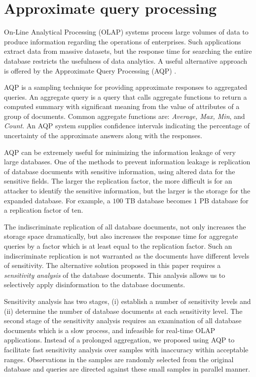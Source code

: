 \section{Approximate query processing}
\label{sec:ApproximateQueryProcessing}

On-Line Analytical Processing (OLAP) systems process large volumes of data to produce information regarding the operations of enterprises. Such applications extract data from  massive datasets, but the response time for searching the entire database restricts the usefulness of data analytics. A useful alternative approach is offered  by the Approximate Query Processing (AQP) \cite{Agarwal:2014:KYW:2588555.2593667}.

AQP is a sampling technique for providing approximate responses to aggregated queries. An aggregate query is a query that calls aggregate functions to return a computed summary with significant meaning from the value of attributes of a group of documents. Common aggregate functions are: {\it Average, Max, Min}, and {\it Count}. An AQP system supplies confidence intervals indicating the percentage of uncertainty of the approximate answers along with the responses.  

AQP can be extremely useful for minimizing the information leakage of very large databases.  One of the methods to prevent information leakage is replication of database documents with sensitive information, using altered data for the sensitive  fields.  The larger the replication factor, the more difficult is for an attacker to identify the sensitive information, but  the larger is the storage for the expanded database. For example, a $100$ TB database  becomes $1$ PB database for a replication factor of ten.

The indiscriminate replication of all database documents, not only increases the storage space dramatically, but also increases the response time for aggregate queries by a factor which is at least equal to the replication factor. Such an indiscriminate replication is not warranted as the documents have different levels of sensitivity. The alternative solution proposed in this paper requires a \emph{sensitivity analysis} of the database documents. This analysis allows us to selectively apply disinformation to the database documents.

Sensitivity analysis has two stages, (i) establish a number of sensitivity levels and (ii) determine the number of database documents at each sensitivity level. The second stage of the sensitivity analysis requires an examination of all database documents which is a slow process, and infeasible for real-time OLAP applications. Instead of a prolonged aggregation, we proposed using AQP to facilitate fast sensitivity analysis over samples with inaccuracy within acceptable ranges. Observations in the samples are randomly selected from the original database and queries are directed against these small samples in parallel manner.\\

